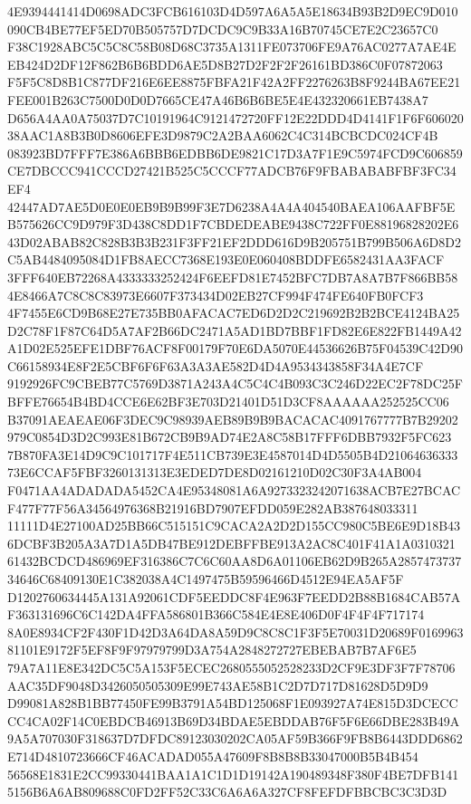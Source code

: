 \documentclass[UTF8,fontset=fandol,zihao=-4,a4paper]{ctexart}
\begin{document}
{{4E9394441414D0698ADC3FCB616103D4D597A6A5A5E18634B93B2D9EC9D010090CB4BE77EF5ED70B505757D7DCDC9C9B33A16B70745CE7E2C23657C0
F38C1928ABC5C5C8C58B08D68C3735A1311FE073706FE9A76AC0277A7AE4EEB424D2DF12F862B6B6BDD6AE5D8B27D2F2F2F26161BD386C0F07872063
F5F5C8D8B1C877DF216E6EE8875FBFA21F42A2FF2276263B8F9244BA67EE21FEE001B263C7500D0D0D7665CE47A46B6B6BE5E4E432320661EB7438A7
D656A4AA0A75037D7C10191964C9121472720FF12E22DDD4D4141F1F6F60602038AAC1A8B3B0D8606EFE3D9879C2A2BAA6062C4C314BCBCDC024CF4B
083923BD7FFF7E386A6BBB6EDBB6DE9821C17D3A7F1E9C5974FCD9C606859CE7DBCCC941CCCD27421B525C5CCCF77ADCB76F9FBABABABFBF3FC34EF4
42447AD7AE5D0E0E0EB9B9B99F3E7D6238A4A4A404540BAEA106AAFBF5EB575626CC9D979F3D438C8DD1F7CBDEDEABE9438C722FF0E88196828202E6
43D02ABAB82C828B3B3B231F3FF21EF2DDD616D9B205751B799B506A6D8D2C5AB4484095084D1FB8AECC7368E193E0E060408BDDFE6582431AA3FACF
3FFF640EB72268A4333333252424F6EEFD81E7452BFC7DB7A8A7B7F866BB584E8466A7C8C8C83973E6607F373434D02EB27CF994F474FE640FB0FCF3
4F7455E6CD9B68E27E735BB0AFACAC7ED6D2D2C219692B2B2BCE4124BA25D2C78F1F87C64D5A7AF2B66DC2471A5AD1BD7BBF1FD82E6E822FB1449A42
A1D02E525EFE1DBF76ACF8F00179F70E6DA5070E44536626B75F04539C42D90C66158934E8F2E5CBF6F6F63A3A3AE582D4D4A9534343858F34A4E7CF
9192926FC9CBEB77C5769D3871A243A4C5C4C4B093C3C246D22EC2F78DC25FBFFE76654B4BD4CCE6E62BF3E703D21401D51D3CF8AAAAAA252525CC06
B37091AEAEAE06F3DEC9C98939AEB89B9B9BACACAC4091767777B7B29202979C0854D3D2C993E81B672CB9B9AD74E2A8C58B17FFF6DBB7932F5FC623
7B870FA3E14D9C9C101717F4E511CB739E3E4587014D4D5505B4D2106463633373E6CCAF5FBF3260131313E3EDED7DE8D02161210D02C30F3A4AB004
F0471AA4ADADADA5452CA4E95348081A6A9273323242071638ACB7E27BCACF477F77F56A34564976368B21916BD7907EFDD059E282AB387648033311
11111D4E27100AD25BB66C515151C9CACA2A2D2D155CC980C5BE6E9D18B436DCBF3B205A3A7D1A5DB47BE912DEBFFBE913A2AC8C401F41A1A0310321
61432BCDCD486969EF316386C7C6C60AA8D6A01106EB62D9B265A285747373734646C68409130E1C382038A4C1497475B59596466D4512E94EA5AF5F
D1202760634445A131A92061CDF5EEDDC8F4E963F7EEDD2B88B1684CAB57AF363131696C6C142DA4FFA586801B366C584E4E8E406D0F4F4F4F717174
8A0E8934CF2F430F1D42D3A64DA8A59D9C8C8C1F3F5E70031D20689F016996381101E9172F5EF8F9F97979799D3A754A2848272727EBEBAB7B7AF6E5
79A7A11E8E342DC5C5A153F5ECEC2680555052528233D2CF9E3DF3F7F78706AAC35DF9048D3426050505309E99E743AE58B1C2D7D717D81628D5D9D9
D99081A828B1BB77450FE99B3791A54BD125068F1E093927A74E815D3DCECCCC4CA02F14C0EBDCB46913B69D34BDAE5EBDDAB76F5F6E66DBE283B49A
9A5A707030F318637D7DFDC89123030202CA05AF59B366F9FB8B6443DDD6862E714D4810723666CF46ACADAD055A47609F8B8B8B33047000B5B4B454
56568E1831E2CC99330441BAA1A1C1D1D19142A190489348F380F4BE7DFB1415156B6A6AB809688C0FD2FF52C33C6A6A6A327CF8FEFDFBBCBC3C3D3D
}}
\end{document}
